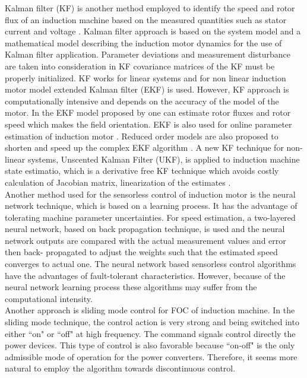 Kalman filter (KF) is another method employed to identify the speed and rotor flux of an induction machine based on the measured quantities such as stator current and voltage \cite{kim}. Kalman filter approach is based on the system model and a mathematical model describing the induction motor dynamics for the use of Kalman filter application. Parameter deviations and measurement disturbance are taken into consideration in KF covariance matrices of the KF must be properly initialized. KF works for linear systems and for non linear induction motor model extended Kalman filter (EKF) is used. However, KF approach is computationally intensive and depends on the accuracy of the model of the motor. In the EKF model proposed by  one can estimate rotor fluxes and rotor speed which makes the field orientation. EKF is also used for online parameter estimation of induction motor \cite{Vas, lcz}. Reduced order models are also proposed to shorten and speed up the complex EKF algorithm \cite{ekf}. A new KF technique for non-linear systems, Unscented Kalman Filter (UKF), is applied to induction machine state estimatio, which is a derivative free KF technique which avoids costly calculation of Jacobian matrix, linearization of the estimates \cite{ukf}.\\


Another method used for the sensorless control of induction motor is the neural network technique, which is based on a learning process. It has the advantage of tolerating machine parameter uncertainties. For speed estimation, a two-layered neural network, based on back propagation technique, is used and the neural network outputs are compared with the actual measurement values and error then back- propagated to adjust the weights such that the estimated speed converges to actual one. The neural network based sensorless control algorithms have the advantages of fault-tolerant characteristics. However, because of the neural network learning process these algorithms may suffer from the computational intensity.\\

Another approach is sliding mode control for FOC of induction machine. In the sliding mode technique, the control action is very strong and being switched into either ``on" or ``off" at high frequency. The command signals control directly the power devices. This type of control is also favorable because ``on-off" is the only admissible mode of operation for the power converters. Therefore, it seems more natural to employ the algorithm towards discontinuous control.\\

